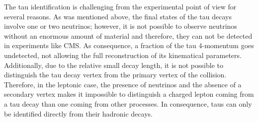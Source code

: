 

\noindent The tau identification is challenging from the experimental point of view
for several reasons. As was mentioned above, the final states of the tau decays involve
one or two neutrinos; however, it is not possible to observe neutrinos without 
an enormous amount of material and therefore, they can not be detected in experiments 
like CMS. As consequence, a fraction of the tau 4-momentum goes undetected, not allowing 
the full reconstruction of its kinematical parameters. Additionally, due to the relative 
small decay length, it is not possible to distinguish the tau decay vertex from 
the primary vertex of the collision. Therefore, in the leptonic case, the presence of 
neutrinos and the absence of a secondary vertex makes it impossible 
to distinguish a charged lepton coming from a tau decay than one coming 
from other processes. In consequence, taus can only be identified directly 
from their hadronic decays. \\

